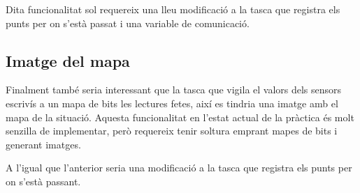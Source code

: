 Dita funcionalitat sol requereix una lleu modificació a la tasca que registra els punts per on s'està
passat i una variable de comunicació.

\subsection{Imatge del mapa}

Finalment també seria interessant que la tasca que vigila el valors dels sensors escrivís a un mapa de bits
les lectures fetes, així es tindria una imatge amb el mapa de la situació. Aquesta funcionalitat 
en l'estat actual de la pràctica és molt senzilla de implementar, però requereix tenir soltura emprant
mapes de bits i generant imatges.

A l'igual que l'anterior seria una modificació a la tasca que registra els punts per on s'està passant.